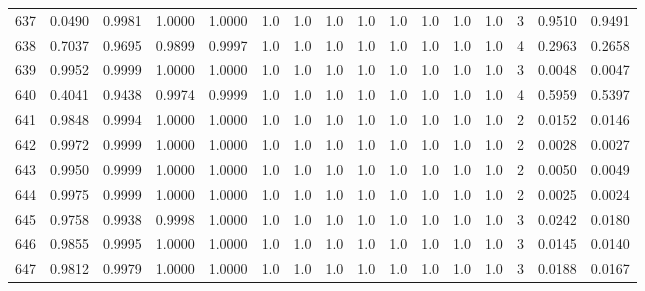 \begin{tabular}{lrrrrrrrrrrrrrrr}
637 &      0.0490 &  0.9981 &  1.0000 &  1.0000 &     1.0 &     1.0 &     1.0 &     1.0 &     1.0 &     1.0 &      1.0 &        1.0 &      3 &                    0.9510 &                     0.9491 \\
638 &      0.7037 &  0.9695 &  0.9899 &  0.9997 &     1.0 &     1.0 &     1.0 &     1.0 &     1.0 &     1.0 &      1.0 &        1.0 &      4 &                    0.2963 &                     0.2658 \\
639 &      0.9952 &  0.9999 &  1.0000 &  1.0000 &     1.0 &     1.0 &     1.0 &     1.0 &     1.0 &     1.0 &      1.0 &        1.0 &      3 &                    0.0048 &                     0.0047 \\
640 &      0.4041 &  0.9438 &  0.9974 &  0.9999 &     1.0 &     1.0 &     1.0 &     1.0 &     1.0 &     1.0 &      1.0 &        1.0 &      4 &                    0.5959 &                     0.5397 \\
641 &      0.9848 &  0.9994 &  1.0000 &  1.0000 &     1.0 &     1.0 &     1.0 &     1.0 &     1.0 &     1.0 &      1.0 &        1.0 &      2 &                    0.0152 &                     0.0146 \\
642 &      0.9972 &  0.9999 &  1.0000 &  1.0000 &     1.0 &     1.0 &     1.0 &     1.0 &     1.0 &     1.0 &      1.0 &        1.0 &      2 &                    0.0028 &                     0.0027 \\
643 &      0.9950 &  0.9999 &  1.0000 &  1.0000 &     1.0 &     1.0 &     1.0 &     1.0 &     1.0 &     1.0 &      1.0 &        1.0 &      2 &                    0.0050 &                     0.0049 \\
644 &      0.9975 &  0.9999 &  1.0000 &  1.0000 &     1.0 &     1.0 &     1.0 &     1.0 &     1.0 &     1.0 &      1.0 &        1.0 &      2 &                    0.0025 &                     0.0024 \\
645 &      0.9758 &  0.9938 &  0.9998 &  1.0000 &     1.0 &     1.0 &     1.0 &     1.0 &     1.0 &     1.0 &      1.0 &        1.0 &      3 &                    0.0242 &                     0.0180 \\
646 &      0.9855 &  0.9995 &  1.0000 &  1.0000 &     1.0 &     1.0 &     1.0 &     1.0 &     1.0 &     1.0 &      1.0 &        1.0 &      3 &                    0.0145 &                     0.0140 \\
647 &      0.9812 &  0.9979 &  1.0000 &  1.0000 &     1.0 &     1.0 &     1.0 &     1.0 &     1.0 &     1.0 &      1.0 &        1.0 &      3 &                    0.0188 &                     0.0167 \\

\end{tabular}
